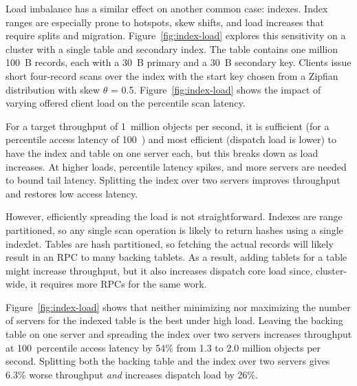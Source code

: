 Load imbalance has a similar effect on another common case: indexes.
Index ranges are especially prone to hotspots, skew shifts, and load increases
that require splits and migration.
%
Figure~\ref{fig:index-load} explores this sensitivity on a cluster with a single
table and secondary index.  The table contains one million 100~B
records, each
with a 30~B primary and a 30~B secondary key. Clients issue short four-record scans over
the index with the start key chosen from a Zipfian distribution with skew
$\theta$ = 0.5.
Figure~\ref{fig:index-load} shows the impact of varying offered client load on
the \nnnth percentile scan latency.

For a target throughput of 1~million objects per second, it is sufficient
(for a \nnnth percentile access latency of 100~\us) and
most efficient (dispatch load is lower) to have the index and table on one server each, but this breaks
down as load increases. At higher loads, \nnnth percentile latency
spikes, and
more servers are needed to bound tail latency. Splitting the index over two
servers improves throughput and restores low access latency.

However, efficiently spreading the load is not straightforward.  Indexes are
range partitioned, so any single scan operation is likely to return hashes using a single
indexlet.  Tables are hash partitioned, so fetching the actual records will
likely result in an RPC to many backing tablets.  As a result, adding tablets for a table
might increase throughput, but it also increases dispatch core load since, cluster-wide,
it requires more RPCs for the same work.

Figure~\ref{fig:index-load} shows that neither minimizing nor maximizing the
number of servers for the indexed table is the best under high load. Leaving the
backing table on one server and spreading the index over two servers increases
throughput at 100~\us \nnnth percentile access latency by 54\% from 1.3 to 2.0
million objects per second. Splitting both the backing table and the index over two
servers gives 6.3\% worse throughput {\em and} increases dispatch load by 26\%.

